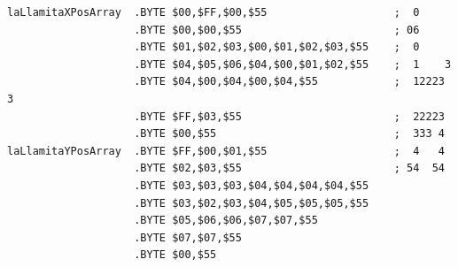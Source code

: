 \begin{lstlisting}
laLlamitaXPosArray  .BYTE $00,$FF,$00,$55                    ;  0       
                    .BYTE $00,$00,$55                        ; 06      
                    .BYTE $01,$02,$03,$00,$01,$02,$03,$55    ;  0      
                    .BYTE $04,$05,$06,$04,$00,$01,$02,$55    ;  1    3 
                    .BYTE $04,$00,$04,$00,$04,$55            ;  12223 3
                    .BYTE $FF,$03,$55                        ;  22223  
                    .BYTE $00,$55                            ;  333 4  
laLlamitaYPosArray  .BYTE $FF,$00,$01,$55                    ;  4   4  
                    .BYTE $02,$03,$55                        ; 54  54  
                    .BYTE $03,$03,$03,$04,$04,$04,$04,$55
                    .BYTE $03,$02,$03,$04,$05,$05,$05,$55
                    .BYTE $05,$06,$06,$07,$07,$55
                    .BYTE $07,$07,$55
                    .BYTE $00,$55

\end{lstlisting}


